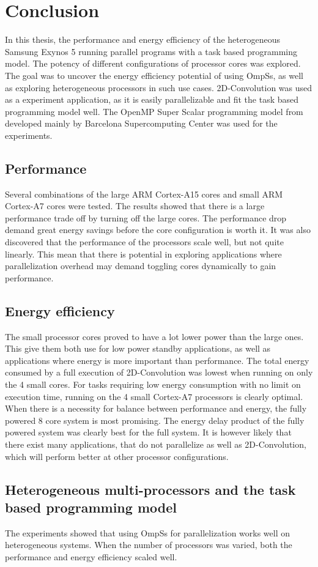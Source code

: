 \chapter[Conclusion]{Conclusion}
In this thesis, the performance and energy efficiency of the heterogeneous Samsung Exynos 5 running parallel programs with a task based programming model.
The potency of different configurations of processor cores was explored.
The goal was to uncover the energy efficiency potential of using OmpSs, as well as exploring heterogeneous processors in such use cases.
2D-Convolution was used as a experiment application, as it is easily parallelizable and fit the task based programming model well.
The OpenMP Super Scalar programming model from developed mainly by Barcelona Supercomputing Center was used for the experiments.

\section{Performance}
Several combinations of the large ARM Cortex-A15 cores and small ARM Cortex-A7 cores were tested.
The results showed that there is a large performance trade off by turning off the large cores.
The performance drop demand great energy savings before the core configuration is worth it.
It was also discovered that the performance of the processors scale well, but not quite linearly.
This mean that there is potential in exploring applications where parallelization overhead may demand toggling cores dynamically to gain performance.

\section{Energy efficiency}
The small processor cores proved to have a lot lower power than the large ones.
This give them both use for low power standby applications, as well as applications where energy is more important than performance.
The total energy consumed by a full execution of 2D-Convolution was lowest when running on only the 4 small cores.
For tasks requiring low energy consumption with no limit on execution time, running on the 4 small Cortex-A7 processors is clearly optimal.
When there is a necessity for balance between performance and energy, the fully powered 8 core system is most promising.
The energy delay product of the fully powered system was clearly best for the full system.
It is however likely that there exist many applications, that do not parallelize as well as 2D-Convolution, which will perform better at other processor configurations.

\section{Heterogeneous multi-processors and the task based programming model}
The experiments showed that using OmpSs for parallelization works well on heterogeneous systems.
When the number of processors was varied, both the performance and energy efficiency scaled well.
